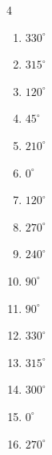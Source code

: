 \begin{multicols}{4}
\begin{enumerate}
  \item $\displaystyle 330^{\circ}$

  \item $\displaystyle 315^{\circ}$

\columnbreak %

\resetques

  \item $\displaystyle 120^{\circ}$

  \item $\displaystyle 45^{\circ}$

  \item $\displaystyle 210^{\circ}$

  \item $\displaystyle 0^{\circ}$
        \phantom{$\displaystyle =0$}

  \item $\displaystyle 120^{\circ}$

  \item $\displaystyle 270^{\circ}$

  \item $\displaystyle 240^{\circ}$

  \item $\displaystyle 90^{\circ}$

  \item $\displaystyle 90^{\circ}$

  \item $\displaystyle 330^{\circ}$

  \item $\displaystyle 315^{\circ}$

  \item $\displaystyle 300^{\circ}$

  \item $\displaystyle 0^{\circ}$
        \phantom{$\displaystyle =0$}

  \item $\displaystyle 270^{\circ}$


\end{enumerate}
\end{multicols}
